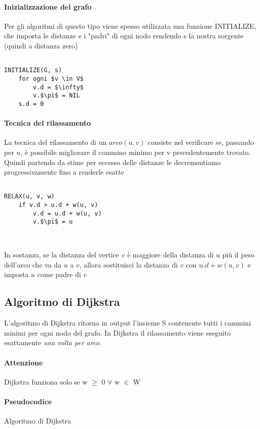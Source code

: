 \documentclass[12pt, a4paper, openany]{book}
\begin{document}
\paragraph*{Inizializzazione del grafo}
Per gli algoritmi di questo tipo viene spesso utilizzata una funzione INITIALIZE, che imposta
le distanze e i "padri" di ogni nodo rendendo s la nostra sorgente (quindi a distanza zero)

\begin{lstlisting}

INITIALIZE(G, s)
    for ogni $v \in V$
        v.d = $\infty$
        v.$\pi$ = NIL
    s.d = 0
\end{lstlisting}

\paragraph{Tecnica del rilassamento}
La tecnica del rilassamento di un $arco (u,v)$ consiste nel verificare se, passando per $u$, è possibile migliorare il cammino minimo
per v precedentemente trovato. Quindi partendo da stime per eccesso delle distanze le decrementiamo progressivamente
fino a renderle esatte

\begin{lstlisting}

RELAX(u, v, w)
    if v.d > u.d + w(u, v)
        v.d = u.d + w(u, v)
        v.$\pi$ = u
    
    
\end{lstlisting}

In sostanza, se la distanza del vertice $v$ è maggiore della distanza di $u$ più il peso
dell'arco che va da $u$ a $v$, allora sostituisci la distanza di $v$ con $u.d + w(u, v)$
e imposta $u$ come padre di $v$

\subsection{Algoritmo di Dijkstra}
L'algoritmo di Dijkstra ritorna in output l'insieme S contenente tutti i cammini minimi per ogni nodo del grafo.
In Dijkstra il rilassamento viene eseguito esattamente \emph{una volta per arco}.

\paragraph{Attenzione}
Dijkstra funziona solo se w $\geq$  0 $\forall$ w $\in$ W

\paragraph{Pseudocodice} Algoritmo di Dijkstra
\end{document}
